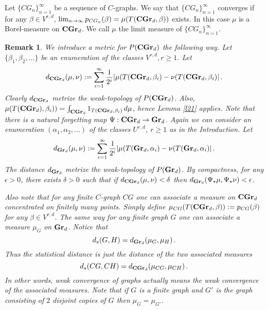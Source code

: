 \documentclass{article}
\newtheorem{remark}{Remark}[section]
\newcommand{\Grd}[1][d]{\textrm{\textbf{Gr}}_{#1}}
\newcommand{\CGrd}[1][d]{\textrm{\textbf{CGr}}_{#1}}
\begin{document}
\noindent
Let $\{CG_n\}^\infty_{n=1}$ be a sequence of $C$-graphs.
We say that $\{CG_n\}^\infty_{n=1}$ converges if
for any $\beta \in V^{r,d}$, $\lim_{n\to\infty} p_{CG_n}(\beta)=
\mu(T(\CGrd,\beta))$ exists. In this case $\mu$ is a Borel-measure
on $\CGrd$. We call $\mu$ the limit measure of $\{CG_n\}^\infty_{n=1}$.
\begin{remark} \label{remark2}
We introduce a metric for $P(\CGrd)$ the following way.
Let $\{\beta_1,\beta_2,\dots\}$ be an enumeration of
the classes $V^{r,d},r\geq 1$. Let
$$d_{\CGrd}(\mu,\nu):=
\sum^\infty_{i=1}\frac{1}{2^i} |\mu(T(\CGrd,\beta_i)-\nu(T(\CGrd,\beta_i)|\,.$$
Clearly $d_{\CGrd}$ metrize the weak-topology of $P(\CGrd)$. Also,
$\mu(T(\CGrd),\beta_i))=\int_{\CGrd} 1_{T(\CGrd,\beta_i)}\,d\mu$,
hence Lemma \ref{l21} applies. Note that there is a natural forgetting
map $\Psi:\CGrd\to\Grd$. Again we can consider an enumeration
$(\alpha_1,\alpha_2,\dots)$ of the classes $U^{r,d}$, $r\geq 1$ as
in the Introduction. 
Let
$$d_{\Grd}(\mu,\nu):=
\sum^\infty_{i=1}\frac{1}{2^i} |\mu(T(\Grd,\alpha_i)-\nu(T(\Grd,\alpha_i)|\,.$$
The distance $d_{\Grd}$ metrize the weak-topology of $P(\Grd)$.
By compactness, for any $\epsilon>0$, there exists $\delta>0$ such that
if $d_{\CGrd}(\mu,\nu)<\delta$ then $d_{\Grd}(\Psi_\star \mu,\Psi_\star \nu)
<\epsilon$.

\noindent
Also note that for any finite $C$-graph $CG$ one can associate
a measure on $\CGrd$ concentrated on finitely many points.
Simply define $\mu_{CG}(T(\CGrd,\beta)):=p_{CG}(\beta)$ for any $\beta\in 
V^{r,d}$. The same way for any finite graph $G$ one can associate
a measure $\mu_{G}$ on $\Grd$. Notice that
$$d_s(G,H)=d_{\Grd}(\mu_{G},\mu_{H})\,.$$
Thus the statistical distance is just the distance of the two
associated measures 
$$d_s(CG,CH)=d_{\CGrd}(\mu_{CG},\mu_{CH})\,.$$
In other words, weak convergence of graphs actually means the weak convergence
of the associated measures. Note that if $G$ is a finite graph and
$G'$ is the graph consisting of $2$ disjoint copies of
$G$ then $\mu_G=\mu_{G'}$.
\end{remark}
\end{document}
